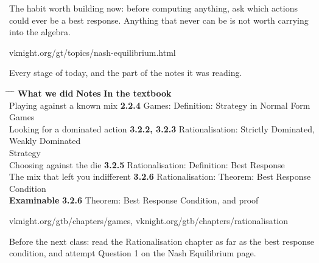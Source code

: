 \vspace{1.4cm}

{\large The habit worth building now: before computing anything, ask which
actions could ever be a best response. Anything that never can be is not worth
carrying into the algebra.}

\vspace{1.6cm}

\begin{center}
{\large\color{inkgrey} vknight.org/gt/topics/nash-equilibrium.html}
\end{center}

\newpage
\nonotes
{}

\vspace{0.3cm}

{\large Every stage of today, and the part of the notes it was reading.}

\vspace{0.35cm}

\hspace{0.3cm}
\begin{minipage}{0.95\linewidth}
\begin{tabbing}
\hspace{6.9cm} \= \hspace{3.0cm} \= \hspace{9.4cm} \= \kill
\textbf{What we did} \> {\color{inkteal}\textbf{Notes}} \> \textbf{In the textbook} \>
  \\[0.5em]
Playing against a known mix \> {\color{inkteal}\textbf{2.2.4}} \> Games: Definition:
  Strategy in Normal Form Games \> \\[0.45em]
Looking for a dominated action \> {\color{inkteal}\textbf{3.2.2, 3.2.3}} \>
  Rationalisation: Strictly Dominated, Weakly Dominated \> \\
\> \> Strategy \> \\[0.45em]
Choosing against the die \> {\color{inkteal}\textbf{3.2.5}} \> Rationalisation:
  Definition: Best Response \> \\[0.45em]
The mix that left you indifferent \> {\color{inkteal}\textbf{3.2.6}} \>
  Rationalisation: Theorem: Best Response Condition \> \\[0.45em]
\textbf{Examinable} \> {\color{inkteal}\textbf{3.2.6}} \> Theorem: Best Response
  Condition, and proof \> 
\end{tabbing}
\end{minipage}

\vspace{0.45cm}

{\color{inkgrey} vknight.org/gtb/chapters/games, \;
  vknight.org/gtb/chapters/rationalisation}

\vspace{0.3cm}

{\large Before the next class: read the Rationalisation chapter as far as the best
  response
  condition, and attempt Question 1 on the Nash Equilibrium page.}


